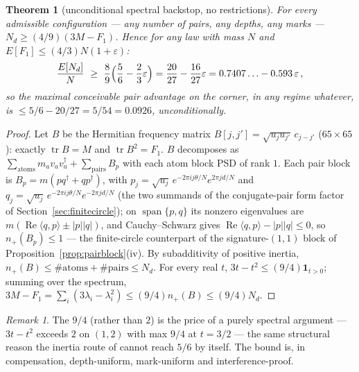 \documentclass[11pt]{article}
\theoremstyle{plain}
\newtheorem{theorem}{Theorem}[section]
\theoremstyle{definition}
\theoremstyle{remark}
\newtheorem*{remk}{Remark}
\newcommand{\tr}{\operatorname{tr}}
\newcommand{\Nd}{N_{d}}
\newcommand{\one}{\mathbf{1}}
\begin{document}
\begin{theorem}[unconditional spectral backstop, no restrictions]
\label{thm:backstop}
For every admissible configuration --- any number of pairs, any depths, any
marks --- $\Nd \ge (4/9)(3M - F_1)$. Hence for any law with mass $N$ and
$E[F_1] \le (4/3)N(1 + \varepsilon)$:
\[
  \frac{E[\Nd]}{N} \ \ge\ \frac{8}{9}\Bigl( \frac{5}{6}
    - \frac{2}{3}\varepsilon \Bigr)
  = \frac{20}{27} - \frac{16}{27}\varepsilon
  = 0.7407\ldots - 0.593\,\varepsilon \,,
\]
so the maximal conceivable pair advantage on the corner, in any regime whatever,
is $\le 5/6 - 20/27 = 5/54 = 0.0926$, unconditionally.
\end{theorem}

\begin{proof}
Let $B$ be the Hermitian frequency matrix
$B[j, j'] = \sqrt{u_j u_{j'}}\, c_{j - j'}$ ($65 \times 65$): exactly
$\tr B = M$ and $\tr B^2 = F_1$. $B$ decomposes as
$\sum_{\mathrm{atoms}} m_a v_a v_a^{\dagger} + \sum_{\mathrm{pairs}} B_p$ with
each atom block PSD of rank $1$. Each pair block is
$B_p = m(p q^{\dagger} + q p^{\dagger})$, with
$p_j = \sqrt{u_j}\, e^{-2\pi i j \theta/N} e^{2\pi j d/N}$ and
$q_j = \sqrt{u_j}\, e^{-2\pi i j \theta/N} e^{-2\pi j d/N}$ (the two summands of
the conjugate-pair form factor of Section~\ref{sec:finitecircle}); on
$\operatorname{span}\{p, q\}$ its nonzero eigenvalues are
$m(\operatorname{Re}\langle q, p\rangle \pm |p||q|)$, and Cauchy--Schwarz gives
$\operatorname{Re}\langle q, p\rangle - |p||q| \le 0$, so $n_+(B_p) \le 1$ ---
the finite-circle counterpart of the signature-$(1,1)$ block of
Proposition~\ref{prop:pairblock}(iv). By subadditivity of positive inertia,
$n_+(B) \le \#\mathrm{atoms} + \#\mathrm{pairs} \le \Nd$. For every real $t$,
$3t - t^2 \le (9/4)\one_{t > 0}$; summing over the spectrum,
$3M - F_1 = \sum_i (3\lambda_i - \lambda_i^2) \le (9/4) n_+(B) \le (9/4)\Nd$.
\end{proof}

\begin{remk}
The $9/4$ (rather than $2$) is the price of a purely spectral argument ---
$3t - t^2$ exceeds $2$ on $(1, 2)$ with max $9/4$ at $t = 3/2$ --- the same
structural reason the inertia route of \cite{AF26} cannot reach $5/6$ by itself.
The bound is, in compensation, depth-uniform, mark-uniform and
interference-proof.
\end{remk}
\end{document}
